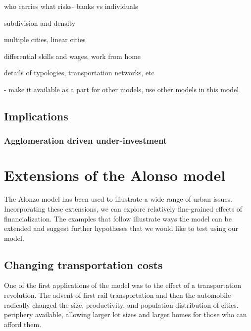 who carries what risks- banks vs individuals

subdivision and density

multiple cities,
linear cities

differential skills and wages,
work from home

details of typologies, transportation networks, etc

- make it available as a part for other models, use other models in this model


 

\subsection{Implications}
\subsubsection{Agglomeration driven under-investment}




\section{Extensions of the Alonso model}

The Alonzo model has been used to illustrate a wide range of urban issues. Incorporating these extensions, we can explore relatively fine-grained effects of financialization. The examples that follow  illustrate   ways the model can be extended and suggest further hypotheses that we  would like to test using our model.



\subsection {Changing transportation costs}

One of the  first  applications of the model was to the effect of a transportation revolution. The advent of first rail transportation and then the automobile radically changed the size, productivity, and population distribution of cities.
periphery available, allowing larger lot sizes and larger homes for those who can afford them.

